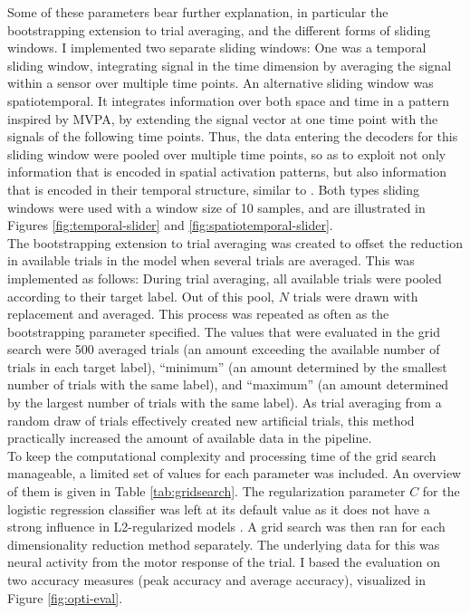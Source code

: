 Some of these parameters bear further explanation, in particular the bootstrapping extension to trial averaging, and the different forms of sliding windows.
I implemented two separate sliding windows: One was a temporal sliding window, integrating signal in the time dimension by averaging the signal within a sensor over multiple time points.
An alternative sliding window was spatiotemporal.
It integrates information over both space and time in a pattern inspired by MVPA, by extending the signal vector at one time point with the signals of the following time points.
Thus, the data entering the decoders for this sliding window were pooled over multiple time points, so as to exploit not only information that is encoded in spatial activation patterns, but also information that is encoded in their temporal structure, similar to \citet{muhle2021hierarchy}.
Both types sliding windows were used with a window size of 10 samples, and are illustrated in Figures \ref{fig:temporal-slider} and \ref{fig:spatiotemporal-slider}.\\
The bootstrapping extension to trial averaging was created to offset the reduction in available trials in the model when several trials are averaged.
This was implemented as follows:
During trial averaging, all available trials were pooled according to their target label.
Out of this pool, $N$ trials were drawn with replacement and averaged.
This process was repeated as often as the bootstrapping parameter specified.
The values that were evaluated in the grid search were 500 averaged trials (an amount exceeding the available number of trials in each target label), ``minimum'' (an amount determined by the smallest number of trials with the same label), and ``maximum'' (an amount determined by the largest number of trials with the same label).
As trial averaging from a random draw of trials effectively created new artificial trials, this method practically increased the amount of available data in the pipeline.\\
To keep the computational complexity and processing time of the grid search manageable, a limited set of values for each parameter was included.
An overview of them is given in Table \ref{tab:gridsearch}.
The regularization parameter $C$ for the logistic regression classifier was left at its default value as it does not have a strong influence in L2-regularized models \citep{VAROQUAUX2017166}.
A grid search was then ran for each dimensionality reduction method separately.
The underlying data for this was neural activity from the motor response of the trial.
I based the evaluation on two accuracy measures (peak accuracy and average accuracy), visualized in Figure \ref{fig:opti-eval}.
